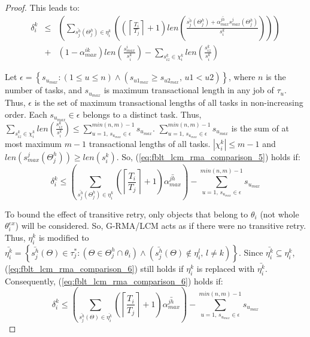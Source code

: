 \documentclass[prodmode,acmtecs]{acmsmall}
\begin{document}
\begin{proof}
This leads to:
\begin{eqnarray}
\delta_i^k & \le & \left(\sum_{\bar{s_{j}^{h}}(\Theta_j^h)\in\eta_{i}^{k}}\left(\left(\left\lceil \frac{T_{i}}{T_{j}}\right\rceil +1\right)len\left(\frac{\bar{s_{j}^{h}}(\Theta_j^h)+\bar{\alpha_{max}^{jh}}s_{max}^{j}(\Theta_j^h)}{s_{i}^{k}}\right)\right)\right)\nonumber \\
 & + & \left(1-\alpha_{max}^{ik}\right)len\left(\frac{s_{max}^{i}}{s_{i}^{k}}\right)-\sum_{s_{iz}^{k}\in\chi_{i}^{k}}len\left(\frac{s_{iz}^{k}}{s_{i}^{k}}\right)\label{eq:fblt_lcm_rma_comparison_5}
\end{eqnarray}

%

Let $\epsilon=\left\{s_{u_{max}}:(1\le u \le n)\wedge \left(s_{u1_{max}} \ge s_{u2_{max}},\,u1 < u2 \right)\right\}$, where $n$ is the number of tasks, and $s_{u_{max}}$ is maximum transactional length in any job of $\tau_u$. Thus, $\epsilon$ is the set of maximum transactional lengths of all tasks in non-increasing order. Each $s_{u_{max}} \in \epsilon$ belongs to a distinct task. Thus, $\sum_{s_{iz}^k \in \chi_i^k}len\left(\frac{s_{iz}^{k}}{s_{i}^{k}}\right)\le \sum_{u=1,\,s_{u_{max}}\in \epsilon}^{min(n,m)-1} s_{u_{max}}$. $\sum_{u=1,\,s_{u_{max}}\in \epsilon}^{min(n,m)-1} s_{u_{max}}$ is the sum of at most maximum $m-1$ transactional lengths of all tasks. $|\chi_i^k|\le m-1$ and $len(s_{max}^{j}(\Theta_j^h)) \ge len(s_{i}^{k})$. So, (\ref{eq:fblt_lcm_rma_comparison_5}) holds if: 
\begin{equation}
\delta_i^k\le\left(\sum_{\bar{s_{j}^{h}}(\Theta_j^h)\in\eta_{i}^{k}}\left(\left\lceil \frac{T_{i}}{T_{j}}\right\rceil +1\right)\bar{\alpha_{max}^{jh}}\right)-\sum_{u=1,\,s_{u_{max}}\in \epsilon}^{min(n,m)-1} s_{u_{max}}\label{eq:fblt_lcm_rma_comparison_6}
\end{equation}

To bound the effect of transitive retry, only objects that belong to $\theta_i$ (not whole $\theta_i^{ex}$) will be considered. So, G-RMA/LCM acts as if there were no transitive retry. Thus, $\eta_i^k$ is modified to $\bar{\eta_i^k}=\left\{ \bar{s_{j}^{h}}(\Theta)\in\tau_{j}^{*}:\left(\Theta \in \Theta_j^h \cap \theta_{i}\right)\wedge\left(\bar{s_{j}^{h}}(\Theta)\not\in\eta_{i}^{l},\, l\ne k\right)\right\}$. Since $\bar{\eta_i^k} \subseteq \eta_i^k$, (\ref{eq:fblt_lcm_rma_comparison_6}) still holds if $\eta_i^k$ is replaced with $\bar{\eta_i^k}$.  Consequently, (\ref{eq:fblt_lcm_rma_comparison_6}) holds if:
\begin{equation}
\delta_i^k\le\left(\sum_{\bar{s_{j}^{h}}(\Theta)\in \bar{\eta_{i}^{k}}}\left(\left\lceil \frac{T_{i}}{T_{j}}\right\rceil +1\right)\bar{\alpha_{max}^{jh}}\right)-\sum_{u=1,\,s_{u_{max}}\in \epsilon}^{min(n,m)-1} s_{u_{max}}\label{eq:fblt_lcm_rma_comparison_7}
\end{equation}


\end{proof}
\end{document}
